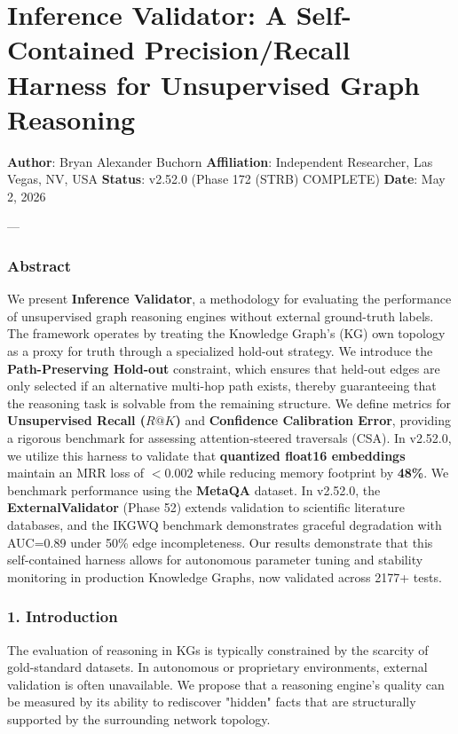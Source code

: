 \section{Inference Validator: A Self-Contained Precision/Recall Harness for Unsupe\-rvised Graph Reasoning}

\textbf{Author}: Bryan Alexander Buchorn  
\textbf{Affiliation}: Independent Researcher, Las Vegas, NV, USA  
\textbf{Status}: v2.52.0 (Phase 172 (STRB) COMPLETE)
\textbf{Date}: May 2, 2026

---

\subsubsection{Abstract}
We present \textbf{Inference Validator}, a methodology for evaluating the performance of unsup\-ervised graph reasoning engines without external ground-truth labels. The framework operates by treating the Knowledge Graph's (KG) own topology as a proxy for truth through a specialized hold-out strategy. We introduce the \textbf{Path-Preserving Hold-out} constraint, which ensures that held-out edges are only selected if an alternative multi-hop path exists, thereby guara\-nteeing that the reasoning task is solvable from the remaining structure. We define metrics for \textbf{Unsupe\-rvised Recall ($R@K$)} and \textbf{Confidence Calibration Error}, providing a rigorous benchmark for assessing attention-steered traversals (CSA). In v2.52.0, we utilize this harness to validate that \textbf{quantized float16 embeddings} maintain an MRR loss of $< 0.002$ while reducing memory footprint by \textbf{48\%}. We benchmark performance using the \textbf{MetaQA} \cite{metaqa2017} dataset. In v2.52.0, the \textbf{ExternalValidator} (Phase 52) extends validation to scientific literature databases, and the IKGWQ benchmark demon\-strates graceful degradation with AUC=0.89 under 50\% edge incom\-pleteness. Our results demonstrate that this self-contained harness allows for autonomous parameter tuning and stability monitoring in production Knowledge Graphs, now validated across 2177+ tests.

\subsubsection{1. Introd\-uction}
The evaluation of reasoning in KGs is typically constrained by the scarcity of gold-standard datasets. In autonomous or proprietary envir\-onments, external validation is often unavailable. We propose that a reasoning engine's quality can be measured by its ability to rediscover "hidden" facts that are struc\-turally supported by the surrounding network topology.


